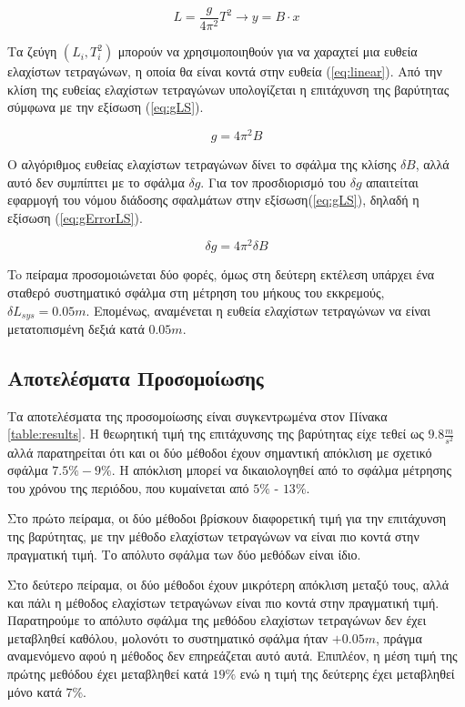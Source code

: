 \documentclass[assignment1.tex]{subfiles}
\begin{document}
\begin{equation}
L = \frac{g}{4\pi^2}T^2 \rightarrow y = B\cdot x
\label{eq:linear}
\end{equation}

Τα ζεύγη $(L_i, T_i^2)$ μπορούν να χρησιμοποιηθούν για να χαραχτεί μια ευθεία ελαχίστων τετραγώνων, η οποία θα είναι κοντά στην ευθεία (\ref{eq:linear}). Από την κλίση της ευθείας ελαχίστων τετραγώνων υπολογίζεται η επιτάχυνση της βαρύτητας σύμφωνα με την εξίσωση (\ref{eq:gLS}).

\begin{equation}
g = 4\pi^2 Β
\label{eq:gLS}
\end{equation}

Ο αλγόριθμος ευθείας ελαχίστων τετραγώνων δίνει το σφάλμα της κλίσης $\delta Β$, αλλά αυτό δεν συμπίπτει με το σφάλμα $\delta g$. Για τον προσδιορισμό του $\delta g$ απαιτείται εφαρμογή του νόμου διάδοσης σφαλμάτων στην εξίσωση(\ref{eq:gLS}), δηλαδή η εξίσωση (\ref{eq:gErrorLS}).

\begin{equation}
\delta g = 4\pi^2 \delta Β
\label{eq:gErrorLS}
\end{equation}

To πείραμα προσομοιώνεται δύο φορές, όμως στη δεύτερη εκτέλεση υπάρχει ένα σταθερό συστηματικό σφάλμα στη μέτρηση του μήκους του εκκρεμούς, $\delta L_{sys}=0.05m$. Επομένως, αναμένεται η ευθεία ελαχίστων τετραγώνων να είναι μετατοπισμένη δεξιά κατά $0.05m$.

\subsection*{Αποτελέσματα Προσομοίωσης}

Τα αποτελέσματα της προσομοίωσης είναι συγκεντρωμένα στον Πίνακα \ref{table:results}. Η θεωρητική τιμή της επιτάχυνσης της βαρύτητας είχε τεθεί ως $9.8\frac{m}{s^2}$ αλλά παρατηρείται ότι και οι δύο μέθοδοι έχουν σημαντική απόκλιση με σχετικό σφάλμα $7.5\% - 9\%$. Η απόκλιση μπορεί να δικαιολογηθεί από το σφάλμα μέτρησης του χρόνου της περιόδου, που κυμαίνεται από $5\%$ - $13\%$.

Στο πρώτο πείραμα, οι δύο μέθοδοι βρίσκουν διαφορετική τιμή για την επιτάχυνση της βαρύτητας, με την μέθοδο ελαχίστων τετραγώνων να είναι πιο κοντά στην πραγματική τιμή. Το απόλυτο σφάλμα των δύο μεθόδων είναι ίδιο.

Στο δεύτερο πείραμα, οι δύο μέθοδοι έχουν μικρότερη απόκλιση μεταξύ τους, αλλά και πάλι η μέθοδος ελαχίστων τετραγώνων είναι πιο κοντά στην πραγματική τιμή. Παρατηρούμε το απόλυτο σφάλμα της μεθόδου ελαχίστων τετραγώνων δεν έχει μεταβληθεί καθόλου, μολονότι το συστηματικό σφάλμα ήταν $+0.05m$, πράγμα αναμενόμενο αφού η μέθοδος δεν επηρεάζεται αυτό αυτά.  Επιπλέον, η μέση τιμή της πρώτης μεθόδου έχει μεταβληθεί κατά $19\%$ ενώ η τιμή της δεύτερης έχει μεταβληθεί μόνο κατά $7\%$.
\end{document}
